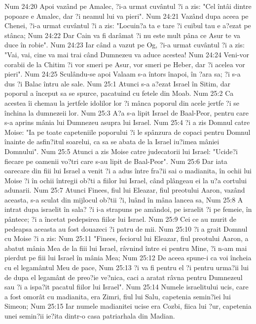 Num 24:20  Apoi vazând pe Amalec, ?i-a urmat cuvântul ?i a zis: "Cel întâi dintre popoare e Amalec, dar ?i neamul lui va pieri".
Num 24:21  Vazând dupa aceea pe Chenei, ?i-a urmat cuvântul ?i a zis: "Locuin?a ta e tare ?i cuibul tau e a?ezat pe stânca;
Num 24:22  Dar Cain va fi darâmat ?i nu este mult pâna ce Asur te va duce în robie".
Num 24:23  Iar când a vazut pe Og, ?i-a urmat cuvântul ?i a zis: "Vai, vai, cine va mai trai când Dumnezeu va aduce acestea!
Num 24:24  Veni-vor corabii de la Chitim ?i vor smeri pe Asur, vor smeri pe Heber, dar ?i acelea vor pieri".
Num 24:25  Sculându-se apoi Valaam s-a întors înapoi, în ?ara sa; ?i s-a dus ?i Balac întru ale sale.
Num 25:1  Atunci s-a a?ezat Israel în Sitim, dar poporul a început sa se spurce, pacatuind cu fetele din Moab.
Num 25:2  Ca acestea îi chemau la jertfele idolilor lor ?i mânca poporul din acele jertfe ?i se închina la dumnezeii lor.
Num 25:3  A?a s-a lipit Israel de Baal-Peor, pentru care s-a aprins mânia lui Dumnezeu asupra lui Israel.
Num 25:4  ?i a zis Domnul catre Moise: "Ia pe toate capeteniile poporului ?i le spânzura de copaci pentru Domnul înainte de asfin?itul soarelui, ca sa se abata de la Israel iu?imea mâniei Domnului".
Num 25:5  Atunci a zis Moise catre judecatorii lui Israel: "Ucide?i fiecare pe oamenii vo?tri care s-au lipit de Baal-Peor".
Num 25:6  Dar iata oarecare din fiii lui Israel a venit ?i a adus între fra?ii sai o madianita, în ochii lui Moise ?i în ochii întregii ob?ti a fiilor lui Israel, când plângeau ei la u?a cortului adunarii.
Num 25:7  Atunci Finees, fiul lui Eleazar, fiul preotului Aaron, vazând aceasta, s-a sculat din mijlocul ob?tii ?i, luând în mâna lancea sa,
Num 25:8  A intrat dupa israelit în sala? ?i i-a strapuns pe amândoi, pe israelit ?i pe femeie, în pântece; ?i a încetat pedepsirea fiilor lui Israel.
Num 25:9  Cei ce au murit de pedeapsa aceasta au fost douazeci ?i patru de mii.
Num 25:10  ?i a grait Domnul cu Moise ?i a zis:
Num 25:11  "Finees, feciorul lui Eleazar, fiul preotului Aaron, a abatut mânia Mea de la fiii lui Israel, râvnind între ei pentru Mine, ?i n-am mai pierdut pe fiii lui Israel în mânia Mea;
Num 25:12  De aceea spune-i ca voi încheia cu el legamântul Meu de pace,
Num 25:13  ?i va fi pentru el ?i pentru urma?ii lui de dupa el legamânt de preo?ie ve?nica, caci a aratat râvna pentru Dumnezeul sau ?i a ispa?it pacatul fiilor lui Israel".
Num 25:14  Numele israelitului ucis, care a fost omorât cu madianita, era Zimri, fiul lui Salu, capetenia semin?iei lui Simeon;
Num 25:15  Iar numele madianitei ucise era Cozbi, fiica lui ?ur, capetenia unei semin?ii ie?ita dintr-o casa patriarhala din Madian.
